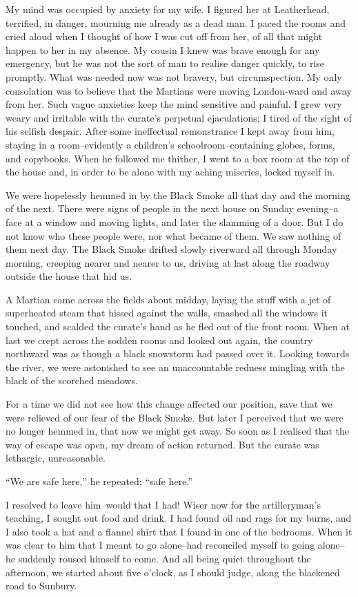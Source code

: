 My mind was occupied by anxiety for my wife. I figured her at
Leatherhead, terrified, in danger, mourning me already as a dead
man. I paced the rooms and cried aloud when I thought of how I was
cut off from her, of all that might happen to her in my absence. My
cousin I knew was brave enough for any emergency, but he was not
the sort of man to realise danger quickly, to rise promptly. What
was needed now was not bravery, but circumspection. My only
consolation was to believe that the Martians were moving
London-ward and away from her. Such vague anxieties keep the mind
sensitive and painful. I grew very weary and irritable with the
curate's perpetual ejaculations; I tired of the sight of his
selfish despair. After some ineffectual remonstrance I kept away
from him, staying in a room--evidently a children's
schoolroom--containing globes, forms, and copybooks. When he
followed me thither, I went to a box room at the top of the house
and, in order to be alone with my aching miseries, locked myself
in.

We were hopelessly hemmed in by the Black Smoke all that day and
the morning of the next. There were signs of people in the next
house on Sunday evening--a face at a window and moving lights, and
later the slamming of a door. But I do not know who these people
were, nor what became of them. We saw nothing of them next day. The
Black Smoke drifted slowly riverward all through Monday morning,
creeping nearer and nearer to us, driving at last along the roadway
outside the house that hid us.

A Martian came across the fields about midday, laying the stuff
with a jet of superheated steam that hissed against the walls,
smashed all the windows it touched, and scalded the curate's hand
as he fled out of the front room. When at last we crept across the
sodden rooms and looked out again, the country northward was as
though a black snowstorm had passed over it. Looking towards the
river, we were astonished to see an unaccountable redness mingling
with the black of the scorched meadows.

For a time we did not see how this change affected our position,
save that we were relieved of our fear of the Black Smoke. But
later I perceived that we were no longer hemmed in, that now we
might get away. So soon as I realised that the way of escape was
open, my dream of action returned. But the curate was lethargic,
unreasonable.

``We are safe here,'' he repeated; ``safe here.''

I resolved to leave him--would that I had! Wiser now for the
artilleryman's teaching, I sought out food and drink. I had found
oil and rags for my burns, and I also took a hat and a flannel
shirt that I found in one of the bedrooms. When it was clear to him
that I meant to go alone--had reconciled myself to going alone--he
suddenly roused himself to come. And all being quiet throughout the
afternoon, we started about five o'clock, as I should judge, along
the blackened road to Sunbury.


